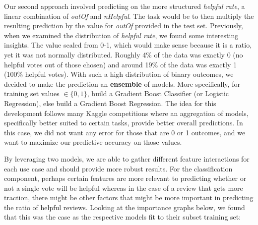 \documentclass[12pt]{article}
\theoremstyle{plain}
\theoremstyle{definition}
\numberwithin{equation}{theorem}
\begin{document}
Our second approach involved predicting on the more structured \textit{helpful rate}, a linear combination of \textit{outOf} and \textit{nHelpful}. The task would be to then multiply the resulting prediction by the value for \textit{outOf} provided in the test set. Previously, when we examined the distribution of \textit{helpful rate}, we found some interesting insights. The value scaled from 0-1, which would make sense because it is a ratio, yet it was not normally distributed. Roughly 4\% of the data was exactly 0 (no helpful votes out of those chosen) and around 19\% of the data was exactly 1 (100\% helpful votes). With such a high distribution of binary outcomes, we decided to make the prediction an \textbf{ensemble} of models. More specifically, for training set values $\in \{0,1\}$, build a Gradient Boost Classifier (or Logistic Regression), else build a Gradient Boost Regression. The idea for this development follows many Kaggle competitions where an aggregation of models, specifically better suited to certain tasks, provide better overall predictions. In this case, we did not want any error for those that are 0 or 1 outcomes, and we want to maximize our predictive accuracy on those values.

\bigskip
By leveraging two models, we are able to gather different feature interactions for each use case and should provide more robust results. For the classification component, perhaps certain features are more relevant to predicting whether or not a single vote will be helpful whereas in the case of a review that gets more traction, there might be other factors that might be more important in predicting the ratio of helpful reviews. Looking at the importance graphs below, we found that this was the case as the respective models fit to their subset training set: 
\end{document}
